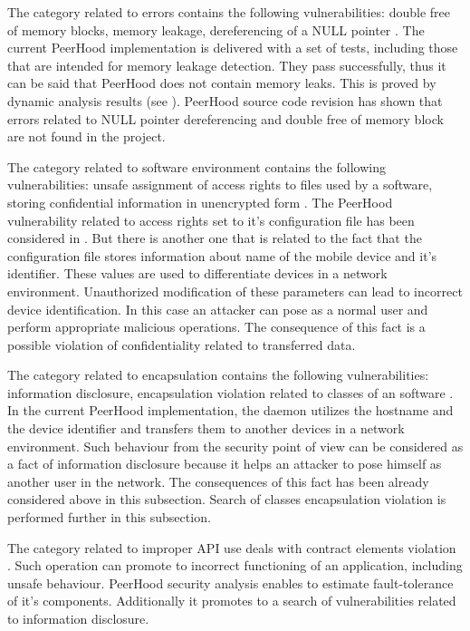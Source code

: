 %
The category related to errors contains the following vulnerabilities: double free of memory blocks, memory leakage, dereferencing of a NULL pointer . 
%
The current PeerHood implementation is delivered with a set of tests, including those that are intended for memory leakage detection. 
%
They pass successfully, thus it can be said that PeerHood does not contain memory leaks. 
%
This is proved by dynamic analysis results (see ). 
%
PeerHood source code revision has shown that errors related to NULL pointer dereferencing and double free of memory block are not found in the project. 

%
The category related to software environment contains the following vulnerabilities: unsafe assignment of access rights to files used by a software, storing confidential information in unencrypted form . 
%
The PeerHood vulnerability related to access rights set to it's configuration file has been considered in . 
%
But there is another one that is related to the fact that the configuration file stores information about name of the mobile device and it's identifier. 
%
These values are used to differentiate devices in a network environment. 
%
Unauthorized modification of these parameters can lead to incorrect device identification. 
%
In this case an attacker can pose as a normal user and perform appropriate malicious operations. 
%
The consequence of this fact is a possible violation of confidentiality related to transferred data. 

%
The category related to encapsulation contains the following vulnerabilities: information disclosure, encapsulation violation related to classes of an software . 
%
In the current PeerHood implementation, the daemon utilizes the hostname and the device identifier and transfers them to another devices in a network environment. 
%
Such behaviour from the security point of view can be considered as a fact of information disclosure because it helps an attacker to pose himself as another user in the network. 
%
The consequences of this fact has been already considered above in this subsection. 
%
Search of  classes encapsulation violation is performed further in this subsection. 

%
The category related to improper API use deals with  contract elements violation . 
%
Such operation can promote to incorrect functioning of an application, including unsafe behaviour. 
%
PeerHood  security analysis enables to estimate fault-tolerance of it's components. 
%
Additionally it promotes to a search of vulnerabilities related to information disclosure. 

